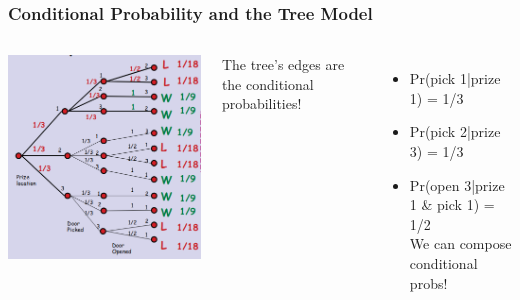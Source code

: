 \documentclass{beamer}
\begin{document}
\begin{frame}
  \frametitle{Conditional Probability and the Tree Model}

  \begin{columns}
    \includegraphics[width=1\textwidth]{../img/monty_tree_2}
      {\large
        The tree's edges are the conditional probabilities!
        \bigskip

        \begin{itemize}
        \item Pr(pick 1|prize 1) = 1/3
        \item Pr(pick 2|prize 3) = 1/3
          \bigskip
          
        \item Pr(open 3|prize 1 \& pick 1) = 1/2\\
          We can compose conditional probs!
          
        \end{itemize}
      }
  \end{columns}
\end{frame}
\end{document}
